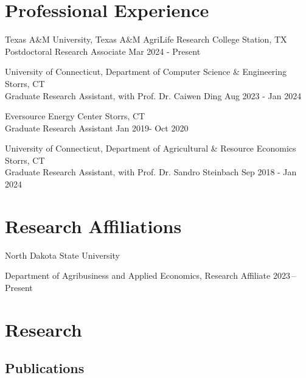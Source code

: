 \documentclass[10.5 pt,letterpaper]{article}
\renewenvironment{itemize}{
	\begin{list}{}{
			\setlength{\leftmargin}{1.5em}
		}
	}{
	\end{list}
}
\begin{document}
 \section*{\textbf{ Professional Experience}}
 \begin{itemize}
 	\item[-]  Texas A\&M University, Texas A\&M AgriLife Research  \hfill College Station, TX \\
 	Postdoctoral Research Associate   \hfill  Mar  2024  - Present
 	
 	  
 	
 	\item[-]    University of Connecticut, Department of Computer Science \& Engineering \hfill   Storrs, CT   \\  Graduate Research Assistant, with Prof. Dr. Caiwen Ding  \hfill    Aug 2023 - Jan 2024 
 	  
 	
 	\item[-]  Eversource Energy Center \hfill Storrs, CT   \\ 
 	Graduate Research Assistant   \hfill    Jan 2019- Oct 2020
 	
 	
  	\item[-]    University of Connecticut, Department of Agricultural \& Resource Economics \hfill   Storrs, CT   \\  Graduate Research Assistant, with Prof. Dr. Sandro Steinbach  \hfill      Sep 2018 - Jan 2024
 

 
 
 \end{itemize}
 
 
	\section*{\textbf{Research  Affiliations}}
	
 
		North Dakota State University 
	\begin{itemize}
		\item[-] Department of Agribusiness and Applied Economics, Research Affiliate	\hfill    2023\,--\,  Present
	\end{itemize}
 
	 
 
	
	\section*{\textbf{Research}}
	
		\subsection*{\textbf{Publications}}
		
\end{document}
